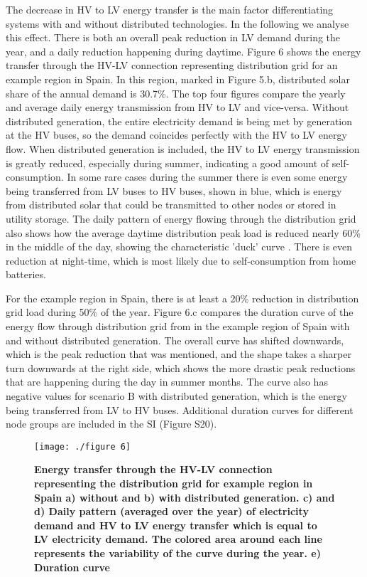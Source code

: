 \documentclass[review]{elsarticle}
\begin{document}
	The decrease in HV to LV energy transfer is the main factor differentiating systems with and without distributed technologies. In the following we analyse this effect. There is both an overall peak reduction in LV demand during the year, and a daily reduction happening during daytime. Figure 6 shows the energy transfer through the HV-LV connection representing distribution grid for an example region in Spain. In this region, marked in Figure 5.b, distributed solar share of the annual demand is 30.7\%. The top four figures compare the yearly and average daily energy transmission from HV to LV and vice-versa. Without distributed generation, the entire electricity demand is being met by generation at the HV buses, so the demand coincides perfectly with the HV to LV energy flow. When distributed generation is included, the HV to LV energy transmission is greatly reduced, especially during summer, indicating a good amount of self-consumption. In some rare cases during the summer there is even some energy being transferred from LV buses to HV buses, shown in blue, which is energy from distributed solar that could be transmitted to other nodes or stored in utility storage. The daily pattern of energy flowing through the distribution grid also shows how the average daytime distribution peak load is reduced nearly 60\% in the middle of the day, showing the characteristic 'duck' curve \cite{denholm2008production,  caiso2016duck}. There is even reduction at night-time, which is most likely due to self-consumption from home batteries.
	
	For the example region in Spain, there is at least a 20\% reduction in distribution grid load during 50\% of the year. Figure 6.c compares the duration curve of the energy flow through distribution grid from in the example region of Spain with and without distributed generation. The overall curve has shifted downwards, which is the peak reduction that was mentioned, and the shape takes a sharper turn downwards at the right side, which shows the more drastic peak reductions that are happening during the day in summer months. The curve also has negative values for scenario B with distributed generation, which is the energy being transferred from LV to HV buses. Additional duration curves for different node groups are included in the SI (Figure S20).
	\begin{figure}
		\texttt{[image: ./figure 6]}
		\caption{\textbf{Energy transfer through the HV-LV connection representing the distribution grid for example region in Spain a) without and b) with distributed generation. c) and d) Daily pattern (averaged over the year) of electricity demand and HV to LV energy transfer which is equal to LV electricity demand. The colored area around each line represents the variability of the curve during the year. e) Duration curve}}
		\label{fig:duration}
	\end{figure}
	
\end{document}
